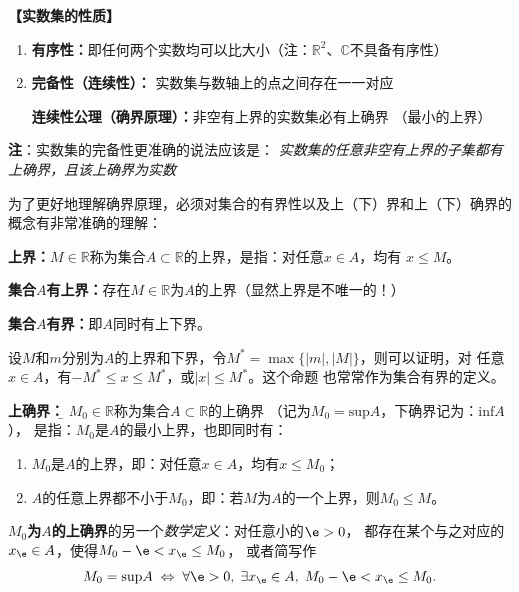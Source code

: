 {\bf 【实数集的性质】}
	\begin{thx}
		\begin{enumerate} 
		  \item {\bf 有序性：}即任何两个实数均可以比大小\quad （注：$\mathbb{R}^2$、$\mathbb{C}$不具备有序性） 
		  \item {\bf 完备性（连续性）： }实数集与数轴上的点之间存在一一对应
			
		  {\bf{连续性公理（确界原理）：}}非空有{上界}的实数集必有{上确界} （最小的上界）
		\end{enumerate}
	\end{thx}
	
	  {\bf 注}：实数集的完备性更准确的说法应该是：
	  {\it 实数集的任意非空有上界的子集都有上确界，且该上确界为实数}
	
	为了更好地理解确界原理，必须对集合的有界性以及上（下）界和上（下）确界的概念有非常准确的理解：
	
	\begin{thx}
		{\bf 上界：}$M\in\mathbb{R}$称为集合$A\subset\mathbb{R}$的上界，是指：对任意$x\in A$，均有
		$x\leq M$。
		
		{\bf 集合$A$有上界：}存在$M\in\mathbb{R}$为$A$的上界（显然上界是不唯一的！）
		
		{\bf 集合$A$有界：}即$A$同时有上下界。
	\end{thx}	
	
		设$M$和$m$分别为$A$的上界和下界，令$M^*=\max\{|m|,|M|\}$，则可以证明，对
		任意$x\in A$，有$-M^*\leq x\leq M^*$，或$|x|\leq M^*$。这个命题
		也常常作为集合有界的定义。
	\begin{thx}
		{\bf 上确界：}{\b
		$M_0\in\mathbb{R}$称为集合$A\subset\mathbb{R}$的上确界
		（记为$M_0=\mathrm{sup}A$，下确界记为：$\mathrm{inf}A$），
		是指：$M_0$是$A$的最小上界}，也即同时有：
		\begin{enumerate}[(1)]
		  \setlength{\itemindent}{1cm}
		  \item $M_0$是$A$的上界，即：对任意$x\in A$，均有$x\leq M_0$；
		  \item $A$的任意上界都不小于$M_0$，即：若$M$为$A$的一个上界，则$M_0\leq M$。
		\end{enumerate}
		{\bf $M_0$为$A$的上确界}的另一个{\it 数学定义}：对任意小的$\e>0$，
		都存在某个与之对应的$x_{\e}\in A$，使得$M_0-\e<x_{\e}\leq M_0$，
		或者简写作
		$$M_0=\mathrm{sup}A\;\Leftrightarrow\;
		\forall\e>0,\;\exists x_{\e}\in A,\;M_0-\e<x_{\e}\leq M_0.$$
	\end{thx}

